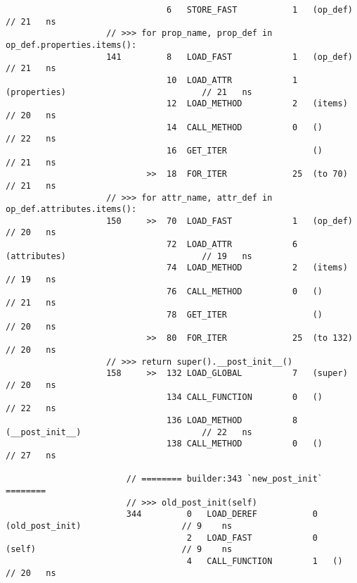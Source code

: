 \begin{code}
\begin{verbatim}
                                6   STORE_FAST           1   (op_def)                               // 21   ns
                    // >>> for prop_name, prop_def in op_def.properties.items():
                    141         8   LOAD_FAST            1   (op_def)                               // 21   ns
                                10  LOAD_ATTR            1   (properties)                           // 21   ns
                                12  LOAD_METHOD          2   (items)                                // 20   ns
                                14  CALL_METHOD          0   ()                                     // 22   ns
                                16  GET_ITER                 ()                                     // 21   ns
                            >>  18  FOR_ITER             25  (to 70)                                // 21   ns
                    // >>> for attr_name, attr_def in op_def.attributes.items():
                    150     >>  70  LOAD_FAST            1   (op_def)                               // 20   ns
                                72  LOAD_ATTR            6   (attributes)                           // 19   ns
                                74  LOAD_METHOD          2   (items)                                // 19   ns
                                76  CALL_METHOD          0   ()                                     // 21   ns
                                78  GET_ITER                 ()                                     // 20   ns
                            >>  80  FOR_ITER             25  (to 132)                               // 20   ns
                    // >>> return super().__post_init__()
                    158     >>  132 LOAD_GLOBAL          7   (super)                                // 20   ns
                                134 CALL_FUNCTION        0   ()                                     // 22   ns
                                136 LOAD_METHOD          8   (__post_init__)                        // 22   ns
                                138 CALL_METHOD          0   ()                                     // 27   ns

                        // ======== builder:343 `new_post_init` ========
                        // >>> old_post_init(self)
                        344         0   LOAD_DEREF           0   (old_post_init)                    // 9    ns
                                    2   LOAD_FAST            0   (self)                             // 9    ns
                                    4   CALL_FUNCTION        1   ()                                 // 20   ns


\end{verbatim}
\end{code}
